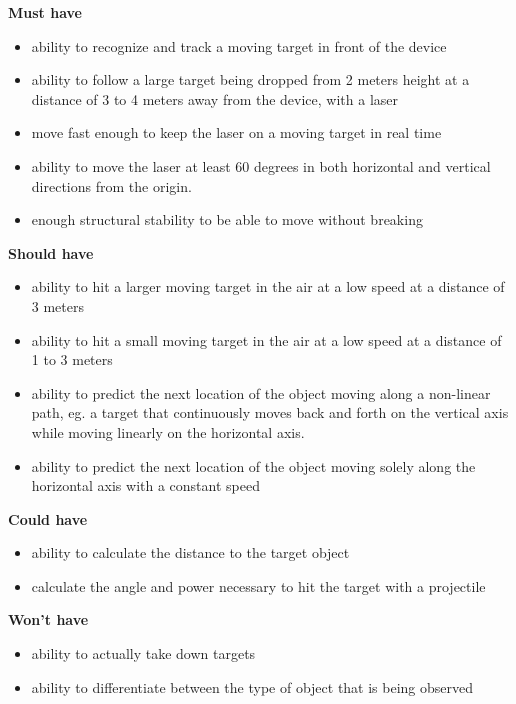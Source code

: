\textbf{Must have}
\begin{itemize}
	\item ability to recognize and track a moving target in front of the device
	\item ability to follow a large target being dropped from 2 meters height at a distance of 3 to 4 meters away from the device, with a laser
	\item move fast enough to keep the laser on a moving target in real time
	\item ability to move the laser at least 60 degrees in both horizontal and vertical directions from the origin.
	\item enough structural stability to be able to move without breaking
\end{itemize}

\textbf{Should have}
\begin{itemize}
	\item ability to hit a larger moving target in the air at a low speed at a distance of 3 meters
	\item ability to hit a small moving target in the air at a low speed at a distance of 1 to 3 meters
	\item ability to predict the next location of the object moving along a non-linear path, eg{.} a target that continuously moves back and forth on the vertical axis while moving linearly on the horizontal axis.
	\item ability to predict the next location of the object moving solely along the horizontal axis with a constant speed
\end{itemize}

\textbf{Could have}
\begin{itemize}
	\item ability to calculate the distance to the target object
	\item calculate the angle and power necessary to hit the target with a projectile
\end{itemize}

\textbf{Won't have}
\begin{itemize}
	\item ability to actually take down targets
	\item ability to differentiate between the type of object that is being observed
\end{itemize}

